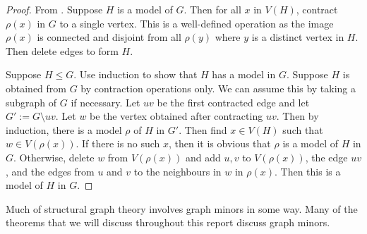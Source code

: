 \begin{proof}
	From \textcite{norinMath599GraphMinors2017}. Suppose \(H\) is a model of \(G\). Then for all \(x\) in \(V(H)\), contract \(\rho(x)\) in \(G\) to a single vertex. This is a well-defined operation as the image $\rho(x)$ is connected and disjoint from all $\rho(y)$ where $y$ is a distinct vertex in $H$. Then delete edges to form \(H\).

	Suppose \(H \leq G\). Use induction to show that \(H\) has a model in \(G\). Suppose \(H\) is obtained from \(G\) by contraction operations only. We can assume this by taking a subgraph of \(G\) if necessary. Let \(uv\) be the first contracted edge and let \(G' := G \setminus uv\). Let \(w\) be the vertex obtained after contracting \(uv\). Then by induction, there is a model \(\rho\) of \(H\) in \(G'\). Then find $x \in V(H)$ such that $w \in V(\rho(x))$. If there is no such $x$, then it is obvious that $\rho$ is a model of $H$ in $G$. Otherwise, 
	delete \(w\) from \(V(\rho(x)) \) and add $u, v$ to $V(\rho(x))$, the edge $uv$, and the edges from $u$ and $v$ to the neighbours in $w$ in $\rho(x)$. Then this is a model of \(H\) in \(G\). 
\end{proof}

 Much of structural graph theory involves graph minors in some way. Many of the theorems that we will discuss throughout this report discuss graph minors. 

